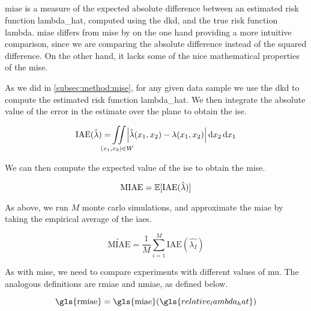 \subsection{\texorpdfstring{}{}}
\label{subsec:method:miae}

\Gls{miae} is a measure of the expected absolute difference between an estimated risk function \gls{lambda_hat},
computed using the \gls{dkd}, and the true risk function \gls{lambda}.
\Gls{miae} differs from \gls{mise} by on the one hand providing a more intuitive comparison,
since we are comparing the absolute difference instead of the squared difference.
On the other hand, it lacks some of the nice mathematical properties of the \gls{mise}.

As we did in \autoref{subsec:method:mise}, for any given data sample we use the \gls{dkd} to compute the estimated risk function \gls{lambda_hat}.
We then integrate the absolute value of the error in the estimate over the plane to obtain the \gls{ise}.

\begin{equation}
    \mbox{IAE}(\hat{\lambda}) = 
        \iintW{
            \left| \hat{\lambda}\xvec - \lambda\xvec \right|
        }
\end{equation}

We can then compute the expected value of the \gls{ise} to obtain the \gls{mise}.

\begin{equation}
    \mbox{MIAE} = \mathbb{E} [\mbox{IAE}(\hat{\lambda})]
\end{equation}

As above, we run $M$ monte carlo simulations,
and approximate the \gls{miae} by taking the empirical average of the \glspl{iae}.

\begin{equation}
    \widetilde{\mbox{MIAE}} = \frac{1}{M} \sum_{i=1}^{M} \mbox{IAE}(\hat{\lambda_I})
\end{equation}

As with \gls{mise}, we need to compare experiments with different values of \gls{mu}.
The analogous definitions are \gls{rmiae} and \gls{nmiae}, as defined below.

\begin{equation}
\label{eq:rmiae}
    \mbox{\gls{rmiae}} = 
        \mbox{\gls{miae}}(\gls{relative_lambda_hat}) \\
\end{equation}

